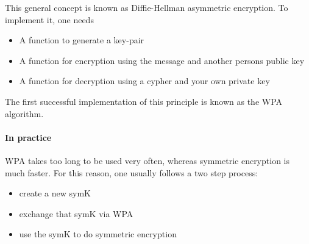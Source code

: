 This general concept is known as Diffie-Hellman asymmetric encryption. To implement it, one needs 
\begin{itemize}
	\item A function to generate a key-pair
	\item A function for encryption using the message and another persons public key
	\item A function for decryption using a cypher and your own private key
\end{itemize}
The first successful implementation of this principle is known as the WPA algorithm. 

\paragraph{In practice} WPA takes too long to be used very often, whereas symmetric encryption is much faster. For this reason, one usually follows a two step process:
\begin{itemize}
	\item create a new symK
	\item exchange that symK via WPA
	\item use the symK to do symmetric encryption
\end{itemize}

